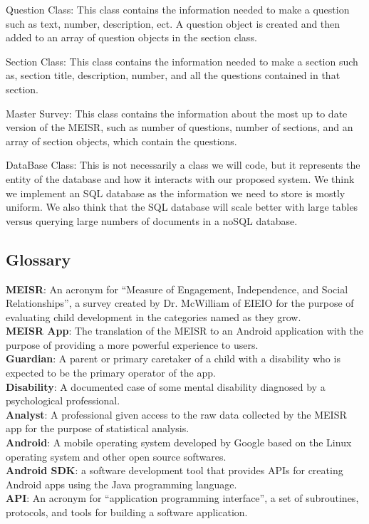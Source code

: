 Question Class:
	This class contains the information needed to make a question such as text, number, description, ect. A question object is created and then added to an array of question objects in the section class.

Section Class:
	This class contains the information needed to make a section such as, section title, description, number, and all the questions contained in that section.

Master Survey:
	This class contains the information about the most up to date version of the MEISR, such as number of questions, number of sections, and an array of section objects, which contain the questions.

DataBase Class:
	This is not necessarily a class we will code, but it represents the entity of the database and how it interacts with our proposed system. We think we implement an SQL database as the information we need to store is mostly uniform. We also think that the SQL database will scale better with large tables versus querying large numbers of documents in a noSQL database.



\begin{appendices}
\chapter{Glossary}
\textbf{MEISR}: An acronym for “Measure of Engagement, Independence, and Social Relationships”, a survey created by Dr. McWilliam of EIEIO for the purpose of evaluating child development in the categories named as they grow.\\
\textbf{MEISR App}: The translation of the MEISR to an Android application with the purpose of providing a more powerful experience to users.\\
\textbf{Guardian}: A parent or primary caretaker of a child with a disability who is expected to be the primary operator of the app.\\
\textbf{Disability}: A documented case of some mental disability diagnosed by a psychological professional.\\
\textbf{Analyst}: A professional given access to the raw data collected by the MEISR app for the purpose of statistical analysis.\\
\textbf{Android}: A mobile operating system developed by Google based on the Linux operating system and other open source softwares.\\
\textbf{Android SDK}: a software development tool that provides APIs for creating Android apps using the Java programming language.\\
\textbf{API}: An acronym for “application programming interface”, a set of subroutines, protocols, and tools for building a software application.\\
\end{appendices}


